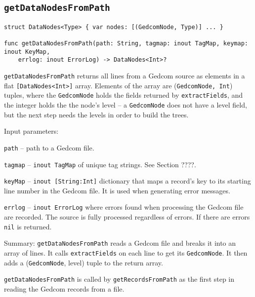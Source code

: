 %
%

\subsection{\texttt{getDataNodesFromPath}}
\begin{verbatim}
struct DataNodes<Type> { var nodes: [(GedcomNode, Type)] ... }
 
func getDataNodesFromPath(path: String, tagmap: inout TagMap, keymap: inout KeyMap,
    errlog: inout ErrorLog) -> DataNodes<Int>?
\end{verbatim}

\texttt{getDataNodesFromPath} returns all lines from a Gedcom source as
elements in a flat
\texttt{[DataNodes<Int>]} array.
Elements of the array are (\texttt{GedcomNode,~Int}) tuples, where the
\texttt{GedcomNode}
holds the fields returned by \texttt{extractFields}, and the integer holds
the the node's level -- a
\texttt{GedcomNode} does not have a level field, but the next step needs
the levels in order to build the trees.

Input parameters:

\texttt{path} -- path to a Gedcom file.

\texttt{tagmap} -- \texttt{inout TagMap} of unique tag strings. See Section ????.

\texttt{keyMap} -- \texttt{inout [String:Int]} dictionary that maps
a record's key to its starting line number in the Gedcom file.
It is used when generating error messages.

\texttt{errlog} -- \texttt{inout ErrorLog} where errors found when
processing the Gedcom file are recorded. The source is fully processed regardless of errors.
If there are errors \texttt{nil} is returned.

Summary: \texttt{getDataNodesFromPath} reads a Gedcom file and breaks it
into an array of lines.
It calls \texttt{extractFields} on each line to get its \texttt{GedcomNode}.
It then adds a (\texttt{GedcomNode}, level)
tuple to the return array.

\texttt{getDataNodesFromPath} is called by \texttt{getRecordsFromPath} as
the first step in reading the Gedcom records from a file.

%
%

